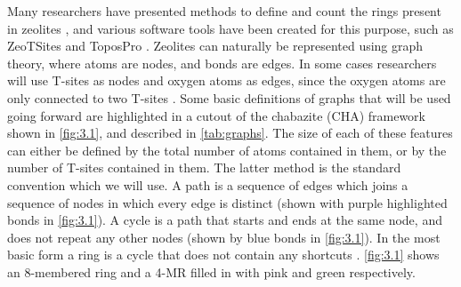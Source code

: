 \documentclass[preprint,numrefs,noinfo,sort&compress]{elsarticle}
\begin{document}
Many researchers have presented methods to define and count the rings present in zeolites \cite{guttman-ring-1990,goetzke-properties-1991,franzblau-computation-1991,yuan-efficient-2002-1,wooten-structure-2002,le-roux-ring-2010,sastre-zeotsites-2001}, and various software tools have been created for this purpose, such as ZeoTSites \cite{sastre-zeotsites-2001} and ToposPro \cite{blatov-applied-2014}. Zeolites can naturally be represented using graph theory, where atoms are nodes, and bonds are edges. In some cases researchers will use T-sites as nodes and oxygen atoms as edges, since the oxygen atoms are only connected to two T-sites \cite{goetzke-properties-1991}. Some basic definitions of graphs that will be used going forward are highlighted in a cutout of the chabazite (CHA) framework shown in \cref{fig:3.1}, and described in \cref{tab:graphs}. The size of each of these features can either be defined by the total number of atoms contained in them, or by the number of T-sites contained in them. The latter method is the standard convention which we will use. A path is a sequence of edges which joins a sequence of nodes in which every edge is distinct (shown with purple highlighted bonds in \cref{fig:3.1}). A cycle is a path that starts and ends at the same node, and does not repeat any other nodes (shown by blue bonds in \cref{fig:3.1}). In the most basic form a ring is a cycle that does not contain any shortcuts \cite{guttman-ring-1990,goetzke-properties-1991}. \cref{fig:3.1} shows an 8-membered ring and a 4-MR filled in with pink and green respectively.  
\end{document}
